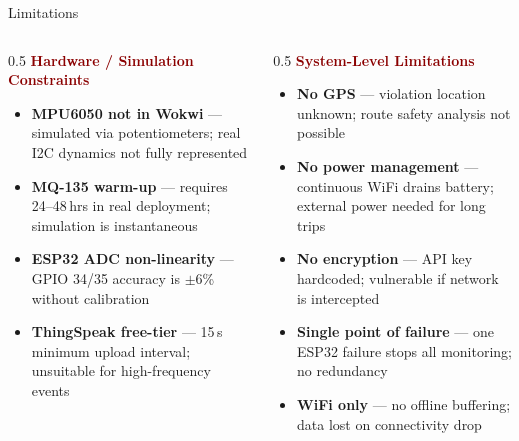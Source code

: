 \documentclass[aspectratio=169, 10pt]{beamer}
\begin{document}
\begin{frame}[shrink=2]{Limitations}
  \begin{columns}[T]
    \begin{column}{0.5\textwidth}
      \textbf{\textcolor{darkred}{Hardware / Simulation Constraints}}
      \begin{itemize}\setlength\itemsep{0.3em}
        \item \textbf{MPU6050 not in Wokwi} --- simulated via potentiometers; real I2C dynamics not fully represented
        \item \textbf{MQ-135 warm-up} --- requires 24--48\,hrs in real deployment; simulation is instantaneous
        \item \textbf{ESP32 ADC non-linearity} --- GPIO 34/35 accuracy is $\pm6$\% without calibration
        \item \textbf{ThingSpeak free-tier} --- 15\,s minimum upload interval; unsuitable for high-frequency events
      \end{itemize}
    \end{column}
    \begin{column}{0.5\textwidth}
      \textbf{\textcolor{darkred}{System-Level Limitations}}
      \begin{itemize}\setlength\itemsep{0.3em}
        \item \textbf{No GPS} --- violation location unknown; route safety analysis not possible
        \item \textbf{No power management} --- continuous WiFi drains battery; external power needed for long trips
        \item \textbf{No encryption} --- API key hardcoded; vulnerable if network is intercepted
        \item \textbf{Single point of failure} --- one ESP32 failure stops all monitoring; no redundancy
        \item \textbf{WiFi only} --- no offline buffering; data lost on connectivity drop
      \end{itemize}
    \end{column}
  \end{columns}
\end{frame}
\end{document}
